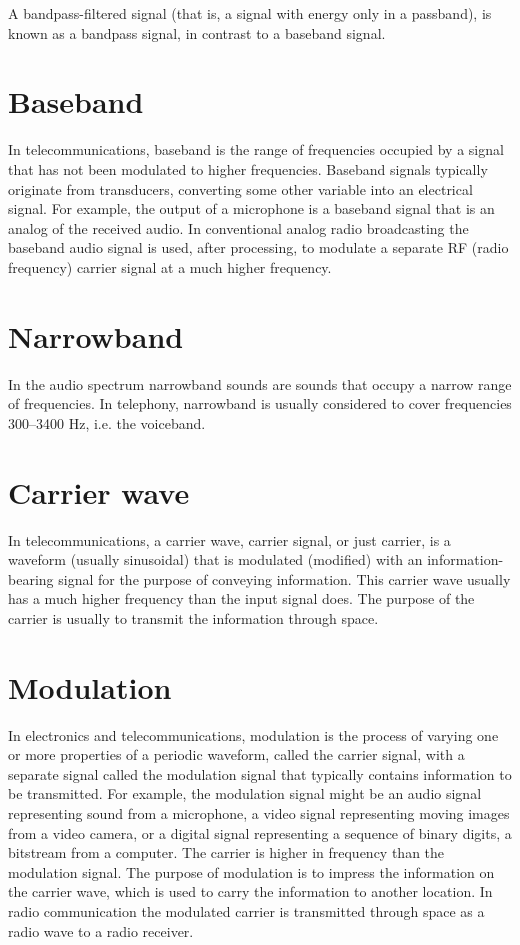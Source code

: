 \documentclass[journal,compsoc]{IEEEtran}
\begin{document}
A bandpass-filtered signal (that is, a signal with energy only in a passband), is known as a bandpass signal, in contrast to a baseband signal.

\section{Baseband}
In telecommunications, baseband is the range of frequencies occupied by a signal that has not been modulated to higher frequencies. Baseband signals typically originate from transducers, converting some other variable into an electrical signal. For example, the output of a microphone is a baseband signal that is an analog of the received audio. In conventional analog radio broadcasting the baseband audio signal is used, after processing, to modulate a separate RF (radio frequency) carrier signal at a much higher frequency.

\section{Narrowband}
In the audio spectrum narrowband sounds are sounds that occupy a narrow range of frequencies. In telephony, narrowband is usually considered to cover frequencies 300–3400 Hz, i.e. the voiceband.

\section{Carrier wave}
In telecommunications, a carrier wave, carrier signal, or just carrier, is a waveform (usually sinusoidal) that is modulated (modified) with an information-bearing signal for the purpose of conveying information. This carrier wave usually has a much higher frequency than the input signal does. The purpose of the carrier is usually to transmit the information through space.

\section{Modulation}
In electronics and telecommunications, modulation is the process of varying one or more properties of a periodic waveform, called the carrier signal, with a separate signal called the modulation signal that typically contains information to be transmitted. For example, the modulation signal might be an audio signal representing sound from a microphone, a video signal representing moving images from a video camera, or a digital signal representing a sequence of binary digits, a bitstream from a computer. The carrier is higher in frequency than the modulation signal. The purpose of modulation is to impress the information on the carrier wave, which is used to carry the information to another location. In radio communication the modulated carrier is transmitted through space as a radio wave to a radio receiver.
\end{document}
